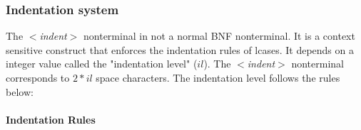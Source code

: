 \documentclass{article}
\begin{document}
\newpage

\subsubsection{Indentation system}
\label{subsubsec:indsys}

The \textit{$<$indent$>$} nonterminal in not a normal BNF nonterminal. It is a
context sensitive construct that enforces the indentation rules of lcases.
It depends on a integer value called the "indentation level" ($il$).
The \textit{$<$indent$>$} nonterminal corresponds to $2*il$ space characters.
The indentation level follows the rules below:

\paragraph{Indentation Rules}
\end{document}
